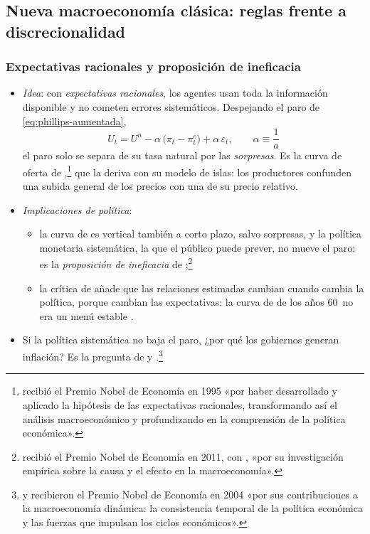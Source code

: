 \documentclass[11pt]{article}
\begin{document}
\subsection{Nueva macroeconomía clásica: reglas frente a discrecionalidad}\label{sec:nmc}

\subsubsection{Expectativas racionales y proposición de ineficacia}\label{sec:expectativas-racionales}

\begin{itemize}
\item \emph{Idea}: con \emph{expectativas racionales}\nocite{Muth1961Rational}, los agentes usan toda la información disponible y no cometen errores sistemáticos. Despejando el paro de \eqref{eq:phillips-aumentada},
  \begin{equation}
  U_t=U^n-\alpha\,\big(\pi_t-\pi^e_t\big)+\alpha\,\varepsilon_t,\qquad \alpha\equiv\frac{1}{a} \label{eq:phillips-kp}
  \end{equation}
  el paro solo se separa de su tasa natural por las \emph{sorpresas}. Es la curva de oferta de \textcite{Lucas1972Expectations},\footnote{ recibió el Premio Nobel de Economía en 1995 «por haber desarrollado y aplicado la hipótesis de las expectativas racionales, transformando así el análisis macroeconómico y profundizando en la comprensión de la política económica»\nocite{Nobel1995Lucas}.} que la deriva con su modelo de islas: los productores confunden una subida general de los precios con una de su precio relativo.
\item \emph{Implicaciones de política}:
  \begin{itemize}
  \item la curva de  es vertical también a corto plazo, salvo sorpresas, y la política monetaria sistemática, la que el público puede prever, no mueve el paro: es la \emph{proposición de ineficacia} de \textcite{SargentWallace1975Rational};\footnote{ recibió el Premio Nobel de Economía en 2011, con , «por su investigación empírica sobre la causa y el efecto en la macroeconomía»\nocite{Nobel2011SargentSims}.}
  \item la crítica de \textcite{Lucas1976Econometric} añade que las relaciones estimadas cambian cuando cambia la política, porque cambian las expectativas: la curva de  de los años 60~no era un menú estable .
  \end{itemize}
\item Si la política sistemática no baja el paro, ¿por qué los gobiernos generan inflación? Es la pregunta de  y .\footnote{ y  recibieron el Premio Nobel de Economía en 2004 «por sus contribuciones a la macroeconomía dinámica: la consistencia temporal de la política económica y las fuerzas que impulsan los ciclos económicos»\nocite{Nobel2004KydlandPrescott}.}
\end{itemize}
\end{document}
